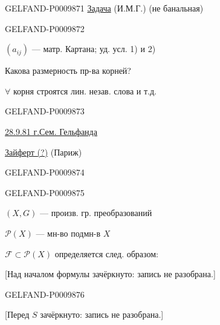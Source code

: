 \begin{GelfandAdjacentEvidence}{GELFAND-P000987}{1}
\underline{Задача} (И.М.Г.) (не банальная)

\end{GelfandAdjacentEvidence}
\begin{GelfandAdjacentEvidence}{GELFAND-P000987}{2}


$(a_{ij})$ --- матр. Картана; уд. усл. 1) и 2)

Какова размерность пр-ва корней?

$\forall$ корня строятся лин. незав. слова и т.д.

\end{GelfandAdjacentEvidence}
\begin{GelfandAdjacentEvidence}{GELFAND-P000987}{3}


\medskip
\underline{28.9.81 г.}\qquad\underline{Сем. Гельфанда}

\underline{Зайферт (?)} (Париж)
\end{GelfandAdjacentEvidence}
\begin{GelfandAdjacentEvidence}{GELFAND-P000987}{4}


\end{GelfandAdjacentEvidence}
\begin{GelfandAdjacentEvidence}{GELFAND-P000987}{5}


$(X,G)$ --- произв. гр. преобразований

$\mathcal P(X)$ --- мн-во подмн-в $X$

$\mathcal F\subset\mathcal P(X)$ определяется след. образом:

[Над началом формулы зачёркнуто: запись не разобрана.]
\end{GelfandAdjacentEvidence}
\begin{GelfandAdjacentEvidence}{GELFAND-P000987}{6}


[Перед $S$ зачёркнуто: запись не разобрана.]
\end{GelfandAdjacentEvidence}
